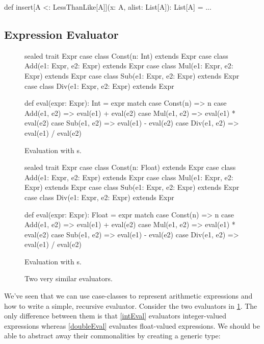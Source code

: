 \documentclass{book}
\begin{document}
\begin{scalacode}
def insert[A <: LessThanLike[A]](x: A, alist: List[A]): List[A] = ...
\end{scalacode}

\subsection{Expression Evaluator}


\begin{figure}
\begin{minipage}{0.45\textwidth}
\begin{scalacode}
sealed trait Expr
case class Const(n: Int) extends Expr
case class Add(e1: Expr, e2: Expr) extends Expr
case class Mul(e1: Expr, e2: Expr) extends Expr
case class Sub(e1: Expr, e2: Expr) extends Expr
case class Div(e1: Expr, e2: Expr) extends Expr

def eval(expr: Expr): Int = expr match {
  case Const(n) => n
  case Add(e1, e2) => eval(e1) + eval(e2)
  case Mul(e1, e2) => eval(e1) * eval(e2)
  case Sub(e1, e2) => eval(e1) - eval(e2)
  case Div(e1, e2) => eval(e1) / eval(e2)
}
\end{scalacode}
\caption{Evaluation with s.}
\label{intEval}
\end{minipage}
\quad\vrule\quad
\begin{minipage}{0.45\textwidth}
\begin{scalacode}
sealed trait Expr
case class Const(n: Float) extends Expr
case class Add(e1: Expr, e2: Expr) extends Expr
case class Mul(e1: Expr, e2: Expr) extends Expr
case class Sub(e1: Expr, e2: Expr) extends Expr
case class Div(e1: Expr, e2: Expr) extends Expr

def eval(expr: Expr): Float = expr match {
  case Const(n) => n
  case Add(e1, e2) => eval(e1) + eval(e2)
  case Mul(e1, e2) => eval(e1) * eval(e2)
  case Sub(e1, e2) => eval(e1) - eval(e2)
  case Div(e1, e2) => eval(e1) / eval(e2)
}
\end{scalacode}
\caption{Evaluation with s.}
\label{doubleEval}
\end{minipage}
\caption{Two very similar evaluators.}\label{twoevals}
\end{figure}


We've seen that we can use case-classes to represent arithmetic expressions
and how to write a simple, recursive evaluator. Consider the two evaluators
in \cref{twoevals}. The only difference between them is that \cref{intEval}
evaluators integer-valued expressions whereas \cref{doubleEval} evaluates
float-valued expressions. We should be able to abstract away their commonalities
by creating a generic type:
\end{document}
